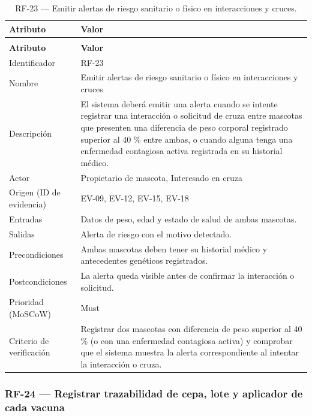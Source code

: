 \documentclass[journal,onecolumn]{IEEEtran}
\makeatletter
\newenvironment{atributos}[2]{%
	\small
	\begin{longtable}{@{}>{\raggedright\arraybackslash}p{4.2cm} >{\raggedright\arraybackslash}p{11.2cm}@{}}
		\caption{#2}\label{tab:#1}\\
		\toprule
		\textbf{Atributo} & \textbf{Valor} \\
		\midrule
		\endfirsthead
		\multicolumn{2}{@{}l}{\small\itshape (continuación)}\\
		\toprule
		\textbf{Atributo} & \textbf{Valor} \\
		\midrule
		\endhead
		\bottomrule
		\endlastfoot
	}{%
	\end{longtable}
	\normalsize
}
\makeatother
\begin{document}
	\begin{atributos}{RF-23}{RF-23 --- Emitir alertas de riesgo sanitario o físico en interacciones y cruces.}
		Identificador & RF-23 \\
		Nombre & Emitir alertas de riesgo sanitario o físico en interacciones y cruces \\
		Descripción & El sistema deberá emitir una alerta cuando se intente registrar una interacción o solicitud de cruza entre mascotas que presenten una diferencia de peso corporal registrado superior al 40 \% entre ambas, o cuando alguna tenga una enfermedad contagiosa activa registrada en su historial médico. \\
		Actor & Propietario de mascota, Interesado en cruza \\
		Origen (ID de evidencia) & EV-09, EV-12, EV-15, EV-18 \\
		Entradas & Datos de peso, edad y estado de salud de ambas mascotas. \\
		Salidas & Alerta de riesgo con el motivo detectado. \\
		Precondiciones & Ambas mascotas deben tener su historial médico y antecedentes genéticos registrados. \\
		Postcondiciones & La alerta queda visible antes de confirmar la interacción o solicitud. \\
		Prioridad (MoSCoW) & Must \\
		Criterio de verificación & Registrar dos mascotas con diferencia de peso superior al 40 \% (o con una enfermedad contagiosa activa) y comprobar que el sistema muestra la alerta correspondiente al intentar la interacción o cruza. \\
	\end{atributos}
	
	\subsubsection{RF-24 --- Registrar trazabilidad de cepa, lote y aplicador de cada vacuna}
	
\end{document}
